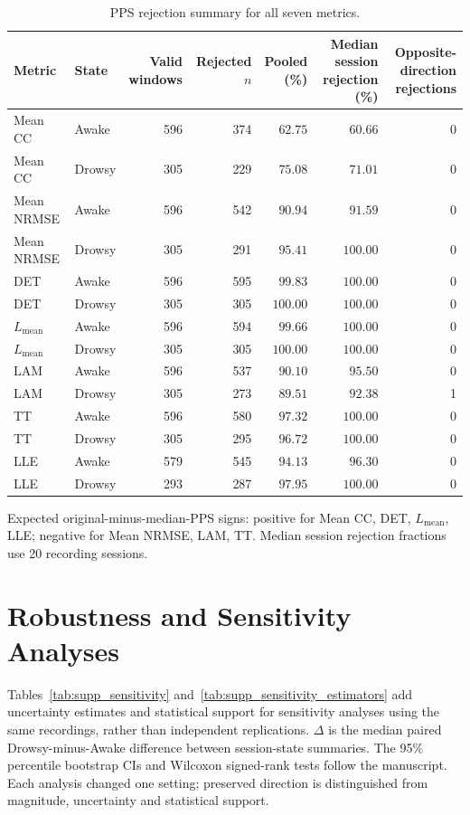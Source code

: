 \documentclass[conference,a4paper]{IEEEtran}
\begin{document}
\begin{table}[t]
\centering
\caption{PPS rejection summary for all seven metrics.}\label{tab:supp_pps}
\footnotesize
\setlength{\tabcolsep}{3pt}
\renewcommand{\arraystretch}{1.05}
\begin{tabular*}{\linewidth}{@{\extracolsep{\fill}}llrrrrr@{}}
\toprule
Metric & State & \makecell{Valid\\windows} & \makecell{Rejected\\$n$} & \makecell{Pooled\\(\%)} & \makecell{Median session\\rejection (\%)} & \makecell{Opposite-direction\\rejections}\\
\midrule
Mean CC & Awake & 596 & 374 & $62.75$ & $60.66$ & 0\\
Mean CC & Drowsy & 305 & 229 & $75.08$ & $71.01$ & 0\\
Mean NRMSE & Awake & 596 & 542 & $90.94$ & $91.59$ & 0\\
Mean NRMSE & Drowsy & 305 & 291 & $95.41$ & $100.00$ & 0\\
DET & Awake & 596 & 595 & $99.83$ & $100.00$ & 0\\
DET & Drowsy & 305 & 305 & $100.00$ & $100.00$ & 0\\
$L_{\mathrm{mean}}$ & Awake & 596 & 594 & $99.66$ & $100.00$ & 0\\
$L_{\mathrm{mean}}$ & Drowsy & 305 & 305 & $100.00$ & $100.00$ & 0\\
LAM & Awake & 596 & 537 & $90.10$ & $95.50$ & 0\\
LAM & Drowsy & 305 & 273 & $89.51$ & $92.38$ & 1\\
TT & Awake & 596 & 580 & $97.32$ & $100.00$ & 0\\
TT & Drowsy & 305 & 295 & $96.72$ & $100.00$ & 0\\
LLE & Awake & 579 & 545 & $94.13$ & $96.30$ & 0\\
LLE & Drowsy & 293 & 287 & $97.95$ & $100.00$ & 0\\
\bottomrule
\end{tabular*}
\par\smallskip
\raggedright Expected original-minus-median-PPS signs: positive for Mean CC, DET, $L_{\mathrm{mean}}$, LLE; negative for Mean NRMSE, LAM, TT. Median session rejection fractions use 20 recording sessions.
\end{table}
\section{Robustness and Sensitivity Analyses}\label{sec:supp_6}
Tables~\ref{tab:supp_sensitivity} and~\ref{tab:supp_sensitivity_estimators} add uncertainty estimates and statistical support for sensitivity analyses using the same recordings, rather than independent replications. $\Delta$ is the median paired Drowsy-minus-Awake difference between session-state summaries. The 95\% percentile bootstrap CIs and Wilcoxon signed-rank tests follow the manuscript. Each analysis changed one setting; preserved direction is distinguished from magnitude, uncertainty and statistical support.
\end{document}
